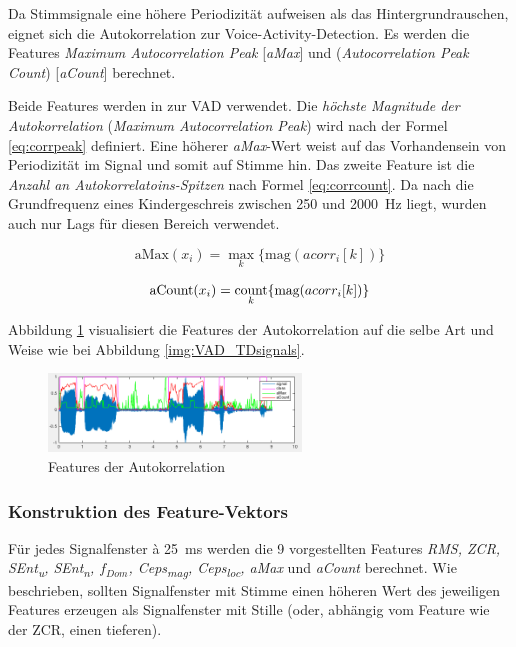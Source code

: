Da Stimmsignale eine höhere Periodizität aufweisen als das Hintergrundrauschen, eignet sich die Autokorrelation zur Voice-Activity-Detection. Es werden die Features \emph{Maximum Autocorrelation Peak} [\emph{aMax}] und (\emph{Autocorrelation Peak Count}) [\emph{aCount}] berechnet. 

Beide Features werden in \cite{vad_granada} zur VAD verwendet. Die \emph{höchste Magnitude der Autokorrelation }  (\emph{Maximum Autocorrelation Peak}) wird nach der Formel \ref{eq:corrpeak} definiert. Eine höherer \emph{aMax}-Wert weist auf das Vorhandensein von Periodizität im Signal und somit auf Stimme hin. Das zweite Feature ist die \emph{Anzahl an Autokorrelatoins-Spitzen} nach Formel \ref{eq:corrcount}. Da nach \cite{lod} die Grundfrequenz eines Kindergeschreis zwischen 250 und \SI{2000}{\hertz} liegt, wurden auch nur Lags für diesen Bereich verwendet. 

\begin{equation}
\text{aMax}(x_i) = \max_{k}\{\text{mag}(acorr_i[k])\}
\label{eq:corrpeak}
\end{equation}

\begin{equation}
\text{aCount}(x_i) = \operatorname*{count}_{k}\{\text{mag}(acorr_i[k])\}
\label{eq:corrcount}
\end{equation}

Abbildung \ref{img:VAD_CoDsignals} visualisiert die Features der Autokorrelation auf die selbe Art und Weise wie bei Abbildung \ref{img:VAD_TDsignals}.

\begin{figure}[h]
	\centering
	\includegraphics[width=0.6\textwidth]{bilder/VAD_CoDsignals.png}
	\caption{Features der Autokorrelation}
	\label{img:VAD_CoDsignals}
\end{figure}

\subsubsection{Konstruktion des Feature-Vektors}

Für jedes Signalfenster à \SI{25}{\milli\second} werden die 9 vorgestellten Features \emph{RMS, ZCR, SEnt\textsubscript{u}, SEnt\textsubscript{n}, $f_{Dom}$, Ceps\textsubscript{mag}, Ceps\textsubscript{loc}, aMax} und \emph{aCount} berechnet. Wie beschrieben, sollten Signalfenster mit Stimme einen höheren Wert des jeweiligen Features erzeugen als Signalfenster mit Stille (oder, abhängig vom Feature wie der ZCR, einen tieferen). 

